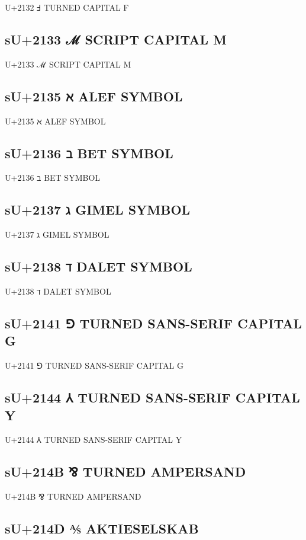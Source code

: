 U+2132 Ⅎ TURNED CAPITAL F

\subsection{sU+2133 ℳ SCRIPT CAPITAL M}

U+2133 ℳ SCRIPT CAPITAL M

\subsection{sU+2135 ℵ ALEF SYMBOL}

U+2135 ℵ ALEF SYMBOL

\subsection{sU+2136 ℶ BET SYMBOL}

U+2136 ℶ BET SYMBOL

\subsection{sU+2137 ℷ GIMEL SYMBOL}

U+2137 ℷ GIMEL SYMBOL

\subsection{sU+2138 ℸ DALET SYMBOL}

U+2138 ℸ DALET SYMBOL

\subsection{sU+2141 ⅁ TURNED SANS-SERIF CAPITAL G}

U+2141 ⅁ TURNED SANS-SERIF CAPITAL G

\subsection{sU+2144 ⅄ TURNED SANS-SERIF CAPITAL Y}

U+2144 ⅄ TURNED SANS-SERIF CAPITAL Y

\subsection{sU+214B ⅋ TURNED AMPERSAND}

U+214B ⅋ TURNED AMPERSAND

\subsection{sU+214D ⅍ AKTIESELSKAB}

